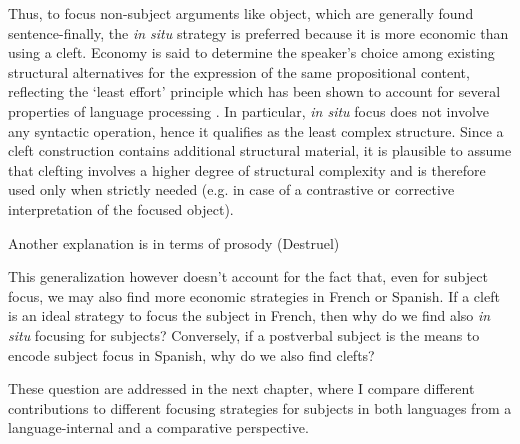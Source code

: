 \documentclass[12pt]{report}
\begin{document}
Thus, to focus non-subject arguments like object, which are generally found sentence-finally, the \textit{in situ} strategy is preferred because it is more economic than using a cleft. Economy is said to determine the speaker’s choice among existing structural alternatives for the expression of the same propositional content, reflecting the ‘least effort’ principle which has been shown to account for several properties of language processing \cite{skopeteas2010focus}.
In particular, \textit{in situ} focus does not involve any syntactic operation, hence it qualifies as the least complex structure. Since a cleft construction contains additional structural material, it is plausible to assume that clefting involves a higher degree of structural complexity and is therefore used only when strictly needed (e.g. in case of a contrastive or corrective interpretation of the focused object).

Another explanation is in terms of prosody (Destruel)

This generalization however doesn't account for the fact that, even for subject focus, we may also find more economic strategies in French or Spanish. If a cleft is an ideal strategy to focus the subject in French, then why do we find also \textit{in situ} focusing for subjects? Conversely, if a postverbal subject is the means to encode subject focus in Spanish, why do we also find clefts? 

These question are addressed in the next chapter, where I compare different contributions to different focusing strategies for subjects in both languages from a language-internal and a comparative perspective.










\end{document}
